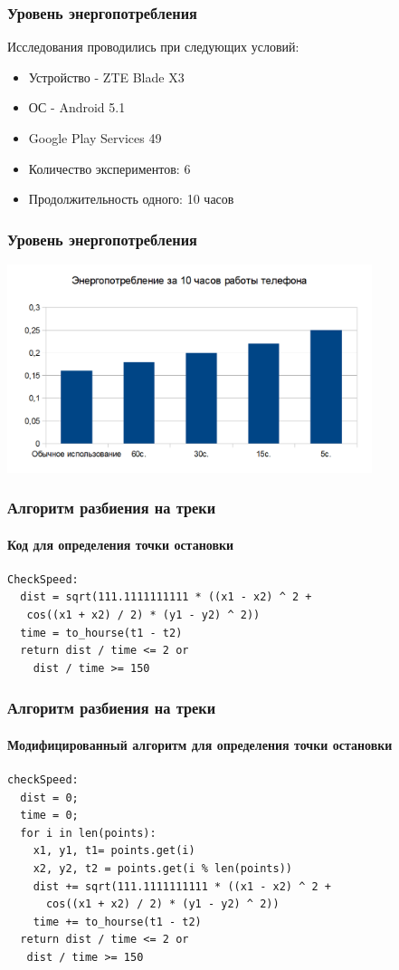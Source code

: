 \documentclass[hyperref={unicode}]{beamer}
\begin{document}
\begin{frame}
\frametitle{Уровень энергопотребления}
Исследования проводились при следующих условий:
\begin{itemize}
	\item Устройство - ZTE Blade X3
	\item ОС - Android 5.1
	\item Google Play Services 49
	\item Количество экспериментов: 6
	\item Продолжительность одного: 10 часов
\end{itemize}

\end{frame}

\begin{frame}
  \frametitle{Уровень энергопотребления}
	\begin{center}
		\includegraphics[width=0.8\textwidth]{images/Consuming.png}
	\end{center}
  
\end{frame}

\begin{frame}[fragile]
\frametitle{Алгоритм разбиения на треки}
\framesubtitle{Код для определения точки остановки}

\begin{lstlisting}
CheckSpeed:
  dist = sqrt(111.1111111111 * ((x1 - x2) ^ 2 + 
   cos((x1 + x2) / 2) * (y1 - y2) ^ 2))
  time = to_hourse(t1 - t2)
  return dist / time <= 2 or
    dist / time >= 150
\end{lstlisting}

\end{frame}

\begin{frame}[fragile]
\frametitle{Алгоритм разбиения на треки}
\framesubtitle{Модифицированный алгоритм для определения точки остановки}

\begin{lstlisting}
checkSpeed:
  dist = 0;
  time = 0;
  for i in len(points):
    x1, y1, t1= points.get(i)
    x2, y2, t2 = points.get(i % len(points))
    dist += sqrt(111.1111111111 * ((x1 - x2) ^ 2 + 
      cos((x1 + x2) / 2) * (y1 - y2) ^ 2))
    time += to_hourse(t1 - t2)
  return dist / time <= 2 or
   dist / time >= 150
\end{lstlisting}

\end{frame}
\end{document}
